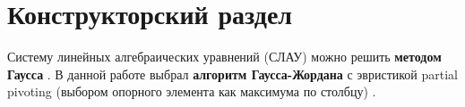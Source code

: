 \chapter{Конструкторский раздел}

Систему линейных алгебраических уравнений (СЛАУ) можно решить \textbf{методом Гаусса} \cite{wiki-gauss}. В данной работе выбрал \textbf{алгоритм Гаусса-Жордана} с эвристикой partial pivoting (выбором опорного элемента как максимума по столбцу) \cite{e-maxx-solve}.




